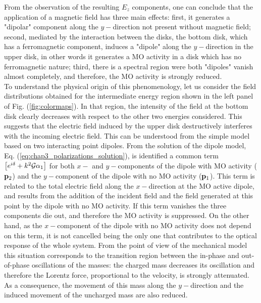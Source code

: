 From the observation of the resulting $E_{z}$ components, one can conclude that the application of a magnetic field has three main effects: first, it generates a "dipolar" component along the $y-$direction not present without magnetic field; second, mediated by the interaction between the disks, the bottom disk, which has a ferromagnetic component, induces a "dipole" along the $y-$direction in the upper disk, in other words it generates a MO activity in a disk which has no ferromagnetic nature; third, there is a spectral region were both "dipoles" vanish almost completely, and therefore, the MO activity is strongly reduced.\\
To understand the physical origin of this phenomenology, let us consider the field distributions obtained for the intermediate energy region shown in the left panel of Fig. (\ref{fig:colormaps}). In that region, the intensity of the field at the bottom disk clearly decreases with respect to the other two energies considered. This suggests that the electric field induced by the upper disk destructively interferes with the incoming electric field. This can be understood from the simple model based on two interacting point dipoles. From the solution of the dipole model, Eq. (\ref{eq:chap3_polarizations_solution}), is identified a common term $\left[e^{i\delta}+k^2{\cal{G}}\alpha_{1}\right]$ for both $x-$ and $y-$components of the dipole with MO activity ($\bold{p}_2$) and the $y-$component of the dipole with no MO activity ($\bold{p}_1$). This term is related to the total electric field along the $x-$direction at the MO active dipole, and results from the addition of the incident field and the field generated at this point by the dipole with no MO activity. If this term vanishes the three components die out, and therefore the MO activity is suppressed. On the other hand, as the $x-$component of the dipole with no MO activity does not depend on this term, it is not cancelled being the only one that contributes to the optical response of the whole system. From the point of view of the mechanical model this situation corresponds to the transition region between the in-phase and out-of-phase oscillations of the masses: the charged mass decreases its oscillation and therefore the Lorentz force, proportional to the velocity, is strongly attenuated. As a consequence, the movement of this mass along the $y-$direction and the induced movement of the uncharged mass are also reduced.\\
